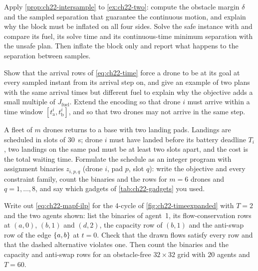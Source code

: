 \begin{exercise}[\difficulty{2}]
\label{exr:ch22-margin}
Apply \cref{prop:ch22-intersample} to \cref{ex:ch22-two}: compute the
obstacle margin $\delta$ and the sampled separation that guarantee the
continuous motion, and explain why the block must be inflated on all four
sides. Solve the safe instance with
 and compare
its fuel, its solve time and its continuous-time minimum separation with
the unsafe plan. Then inflate the block only and report what happens to the
separation between samples.
\end{exercise}

\begin{exercise}[\difficulty{2}]
\label{exr:ch22-time}
Show that the arrival rows of \cref{eq:ch22-time} force a drone to be at
its goal at every sampled instant from its arrival step on, and give an
example of two plans with the same arrival times but different fuel to
explain why the objective adds a small multiple of $J_{\mathrm{fuel}}$.
Extend the encoding so that drone $i$ must arrive within a time window
$[t^i_{\mathrm{a}}, t^i_{\mathrm{b}}]$, and so that two drones may not
arrive in the same step.
\end{exercise}

\begin{exercise}
\label{exr:ch22-schedule}
A fleet of $m$ drones returns to a base with two landing pads. Landings
are scheduled in slots of $30$~s; drone $i$ must have landed before its
battery deadline $T_i$, two landings on the same pad must be at least two
slots apart, and the cost is the total waiting time. Formulate the
schedule as an integer program with assignment binaries $z_{i,p,q}$
(drone $i$, pad $p$, slot $q$): write the objective and every constraint
family, count the binaries and the rows for $m = 6$ drones and $q = 1,
\dots, 8$, and say which gadgets of \cref{tab:ch22-gadgets} you used.
\end{exercise}

\begin{exercise}[\difficulty{2}]
\label{exr:ch22-mapfilp}
Write out \cref{eq:ch22-mapf-ilp} for the 4-cycle of
\cref{fig:ch22-timeexpanded} with $T = 2$ and the two agents shown: list
the binaries of agent~1, its flow-conservation rows at $(a,0)$, $(b,1)$
and $(d,2)$, the capacity row of $(b,1)$ and the anti-swap row of the edge
$\left\{ a,b \right\}$ at $t = 0$. Check that the drawn flows satisfy every row and
that the dashed alternative violates one. Then count the binaries and the
capacity and anti-swap rows for an obstacle-free $32 \times 32$ grid with
$20$ agents and $T = 60$.
\end{exercise}

